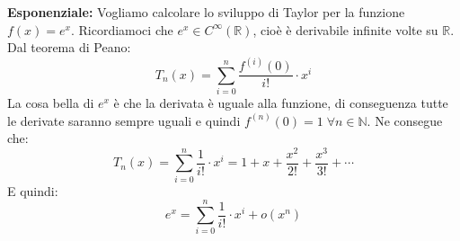 \textbf{Esponenziale:} Vogliamo calcolare lo sviluppo di Taylor per la funzione 
$f(x) = e^x$. Ricordiamoci che $e^x \in C^\infty (\mathbb{R})$, cioè è 
derivabile infinite volte su $\mathbb{R}$. Dal teorema di Peano:
\begin{equation*}
	T_n(x) = \sum \limits_{i = 0}^n \dfrac{f^{(i)}(0)}{i!} \cdot x^i 
\end{equation*}
La cosa bella di $e^x$ è che la derivata è uguale alla funzione, di conseguenza 
tutte le derivate saranno sempre uguali e quindi $f^{(n)}(0) = 1 \; \forall n 
\in \mathbb{N}$. Ne consegue che:
\begin{equation*}
	T_n(x) = \sum \limits_{i = 0}^n \dfrac{1}{i!} \cdot x^i = 1 + x + 
    \dfrac{x^2}{2!} + \dfrac{x^3}{3!} + \cdots
\end{equation*}
E quindi:
\begin{equation*}
	e^x = \sum \limits_{i = 0}^n \dfrac{1}{i!} \cdot x^i + o(x^n)
\end{equation*}


